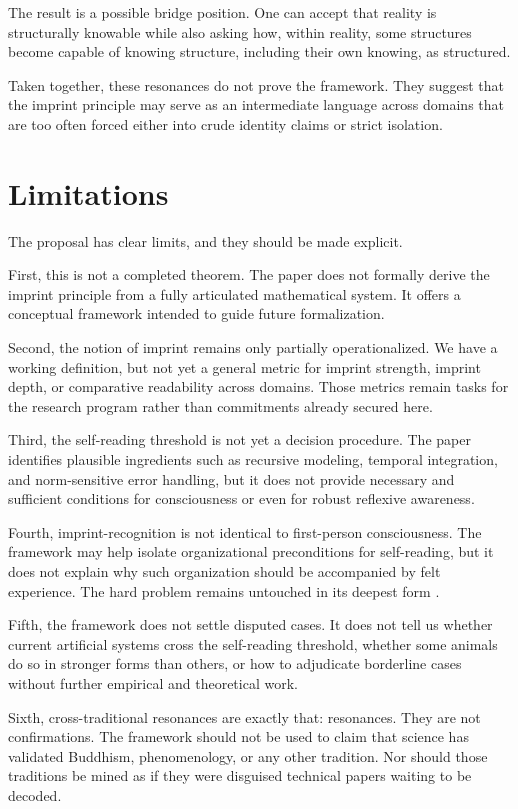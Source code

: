 \documentclass[12pt]{article}
\begin{document}
The result is a possible bridge position. One can accept that reality is structurally knowable while also asking how, within reality, some structures become capable of knowing structure, including their own knowing, as structured.

Taken together, these resonances do not prove the framework. They suggest that the imprint principle may serve as an intermediate language across domains that are too often forced either into crude identity claims or strict isolation.

\section{Limitations}

The proposal has clear limits, and they should be made explicit.

First, this is not a completed theorem. The paper does not formally derive the imprint principle from a fully articulated mathematical system. It offers a conceptual framework intended to guide future formalization.

Second, the notion of imprint remains only partially operationalized. We have a working definition, but not yet a general metric for imprint strength, imprint depth, or comparative readability across domains. Those metrics remain tasks for the research program rather than commitments already secured here.

Third, the self-reading threshold is not yet a decision procedure. The paper identifies plausible ingredients such as recursive modeling, temporal integration, and norm-sensitive error handling, but it does not provide necessary and sufficient conditions for consciousness or even for robust reflexive awareness.

Fourth, imprint-recognition is not identical to first-person consciousness. The framework may help isolate organizational preconditions for self-reading, but it does not explain why such organization should be accompanied by felt experience. The hard problem remains untouched in its deepest form \cite{Levine1983,Chalmers1996}.

Fifth, the framework does not settle disputed cases. It does not tell us whether current artificial systems cross the self-reading threshold, whether some animals do so in stronger forms than others, or how to adjudicate borderline cases without further empirical and theoretical work.

Sixth, cross-traditional resonances are exactly that: resonances. They are not confirmations. The framework should not be used to claim that science has validated Buddhism, phenomenology, or any other tradition. Nor should those traditions be mined as if they were disguised technical papers waiting to be decoded.
\end{document}
